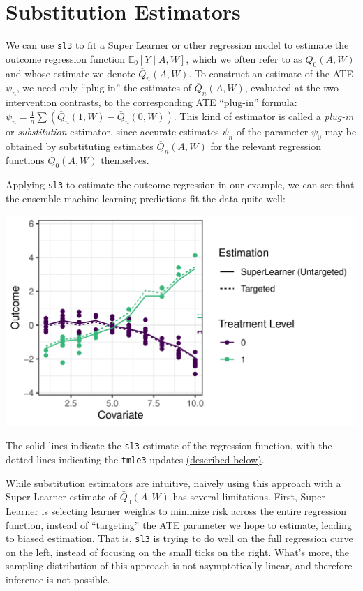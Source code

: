 \documentclass[
  12pt, krantz2,
]{book}
\newcommand{\passthrough}[1]{#1}
\theoremstyle{definition}
\theoremstyle{definition}
\theoremstyle{definition}
\newcommand{\1}{\mathbbm{1}}
\begin{document}
\hypertarget{substitution-est}{%
\section{Substitution Estimators}\label{substitution-est}}

We can use \passthrough{\lstinline!sl3!} to fit a Super Learner or other regression model to estimate
the outcome regression function \(\mathbb{E}_0[Y \mid A,W]\), which we often refer
to as \(\overline{Q}_0(A,W)\) and whose estimate we denote \(\overline{Q}_n(A,W)\).
To construct an estimate of the ATE \(\psi_n\), we need only ``plug-in'' the
estimates of \(\overline{Q}_n(A,W)\), evaluated at the two intervention contrasts,
to the corresponding ATE ``plug-in'' formula:
\(\psi_n = \frac{1}{n}\sum(\overline{Q}_n(1,W)-\overline{Q}_n(0,W))\). This kind
of estimator is called a \emph{plug-in} or \emph{substitution} estimator, since accurate
estimates \(\psi_n\) of the parameter \(\psi_0\) may be obtained by substituting
estimates \(\overline{Q}_n(A,W)\) for the relevant regression functions
\(\overline{Q}_0(A,W)\) themselves.

Applying \passthrough{\lstinline!sl3!} to estimate the outcome regression in our example, we can see
that the ensemble machine learning predictions fit the data quite well:

\begin{center}\includegraphics[width=0.8\linewidth]{img/png/schematic_2b_sllik} \end{center}

The solid lines indicate the \passthrough{\lstinline!sl3!} estimate of the regression function, with the
dotted lines indicating the \passthrough{\lstinline!tmle3!} updates \protect\hyperlink{tmle-updates}{(described below)}.

While substitution estimators are intuitive, naively using this approach with a
Super Learner estimate of \(\bar{Q}_0(A,W)\) has several limitations. First, Super
Learner is selecting learner weights to minimize risk across the entire
regression function, instead of ``targeting'' the ATE parameter we hope to
estimate, leading to biased estimation. That is, \passthrough{\lstinline!sl3!} is trying to do well on
the full regression curve on the left, instead of focusing on the small ticks on
the right. What's more, the sampling distribution of this approach is not
asymptotically linear, and therefore inference is not possible.
\end{document}
